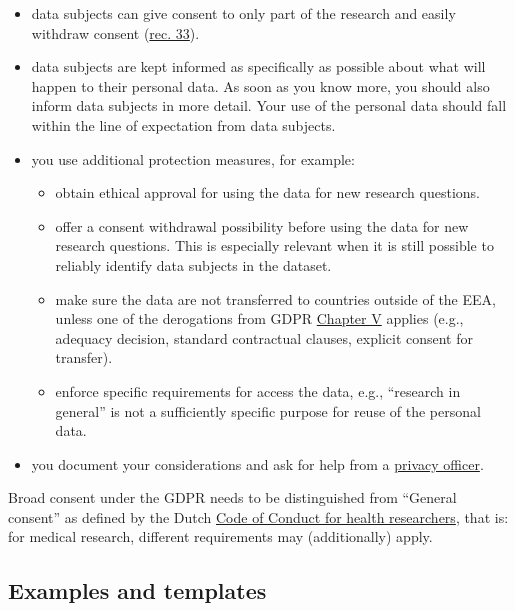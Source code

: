 \documentclass[
]{book}
\providecommand{\tightlist}{%
  \setlength{\itemsep}{0pt}\setlength{\parskip}{0pt}}
\begin{document}
\begin{itemize}
\tightlist
\item
  data subjects can give consent to only part of the research and easily
  withdraw consent
  (\href{https://gdpr-info.eu/recitals/no-33/}{rec. 33}).
\item
  data subjects are kept informed as specifically as possible about what will
  happen to their personal data. As soon as you know more, you should also inform
  data subjects in more detail. Your use of the personal data should fall within
  the line of expectation from data subjects.
\item
  you use additional protection measures, for example:

  \begin{itemize}
  \tightlist
  \item
    obtain ethical approval for using the data for new research questions.
  \item
    offer a consent withdrawal possibility before using the data for new research
    questions. This is especially relevant when it is still possible to reliably
    identify data subjects in the dataset.
  \item
    make sure the data are not transferred to countries outside of the EEA,
    unless one of the derogations from GDPR
    \href{https://gdpr-info.eu/chapter-5/}{Chapter V}
    applies (e.g., adequacy decision, standard contractual clauses, explicit
    consent for transfer).
  \item
    enforce specific requirements for access the data, e.g., ``research in general''
    is not a sufficiently specific purpose for reuse of the personal data.
  \end{itemize}
\item
  you document your considerations and ask for help from a \protect\hyperlink{support}{privacy officer}.
\end{itemize}

Broad consent under the GDPR needs to be distinguished from ``General consent''
as defined by the Dutch
\href{https://www.coreon.org/wp-content/uploads/2022/01/Gedragscode-Gezondheidsonderzoek-2022.pdf}{Code of Conduct for health researchers},
that is: for medical research, different requirements may (additionally) apply.

\hypertarget{examples-and-templates}{%
\subsection{Examples and templates}\label{examples-and-templates}}
\end{document}
